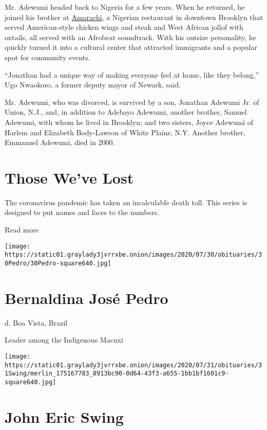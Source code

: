 Mr. Adewumi headed back to Nigeria for a few years. When he returned, he
joined his brother at \href{https://amarachi325.com/}{Amarachi,} a
Nigerian restaurant in downtown Brooklyn that served American-style
chicken wings and steak and West African jollof with oxtails, all served
with an Afrobeat soundtrack. With his outsize personality, he quickly
turned it into a cultural center that attracted immigrants and a popular
spot for community events.

``Jonathan had a unique way of making everyone feel at home, like they
belong,'' Ugo Nwaokoro, a former deputy mayor of Newark, said.

Mr. Adewumi, who was divorced, is survived by a son, Jonathan Adewumi
Jr. of Union, N.J., and, in addition to Adebayo Adewumi, another
brother, Samuel Adewumi, with whom he lived in Brooklyn; and two
sisters, Joyce Adewumi of Harlem and Elizabeth Body-Lawson of White
Plains, N.Y. Another brother, Emmanuel Adewumi, died in 2000.

\href{https://www.nytimes3xbfgragh.onion/interactive/2020/obituaries/people-died-coronavirus-obituaries.html?action=click\&pgtype=Article\&state=default\&region=BELOW_MAIN_CONTENT\&context=covid_obits_promo}{}

\hypertarget{those-weve-lost}{%
\section{Those We've Lost}\label{those-weve-lost}}

The coronavirus pandemic has taken an incalculable death toll. This
series is designed to put names and faces to the numbers.

Read more

\texttt{[image: https://static01.graylady3jvrrxbe.onion/images/2020/07/30/obituaries/30Pedro/30Pedro-square640.jpg]}

\hypertarget{bernaldina-josuxe9-pedro}{%
\section{Bernaldina José Pedro}\label{bernaldina-josuxe9-pedro}}

d. Boa Vista, Brazil

Leader among the Indigenous Macuxi

\texttt{[image: https://static01.graylady3jvrrxbe.onion/images/2020/07/31/obituaries/31Swing/merlin\_175167783\_8913bc90-0d64-43f3-a655-1bb1bf1601c9-square640.jpg]}

\hypertarget{john-eric-swing}{%
\section{John Eric Swing}\label{john-eric-swing}}

